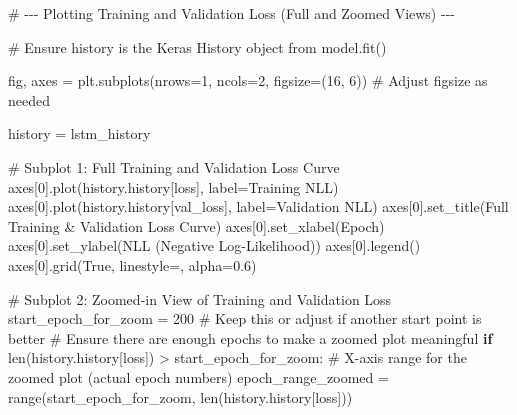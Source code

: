 \documentclass[
  letterpaper,
  DIV=11,
  numbers=noendperiod]{scrreprt}
\newenvironment{Shaded}{\begin{snugshade}}{\end{snugshade}}
\newcommand{\BuiltInTok}[1]{\textcolor[rgb]{0.00,0.23,0.31}{#1}}
\newcommand{\CommentTok}[1]{\textcolor[rgb]{0.37,0.37,0.37}{#1}}
\newcommand{\ControlFlowTok}[1]{\textcolor[rgb]{0.00,0.23,0.31}{\textbf{#1}}}
\newcommand{\DecValTok}[1]{\textcolor[rgb]{0.68,0.00,0.00}{#1}}
\newcommand{\FloatTok}[1]{\textcolor[rgb]{0.68,0.00,0.00}{#1}}
\newcommand{\NormalTok}[1]{\textcolor[rgb]{0.00,0.23,0.31}{#1}}
\newcommand{\OperatorTok}[1]{\textcolor[rgb]{0.37,0.37,0.37}{#1}}
\newcommand{\StringTok}[1]{\textcolor[rgb]{0.13,0.47,0.30}{#1}}
\newcommand{\VariableTok}[1]{\textcolor[rgb]{0.07,0.07,0.07}{#1}}
\begin{document}
\begin{Shaded}
\begin{Highlighting}[]
\CommentTok{\# {-}{-}{-} Plotting Training and Validation Loss (Full and Zoomed Views) {-}{-}{-}}

\CommentTok{\# Ensure \textquotesingle{}history\textquotesingle{} is the Keras History object from model.fit()}

\NormalTok{fig, axes }\OperatorTok{=}\NormalTok{ plt.subplots(nrows}\OperatorTok{=}\DecValTok{1}\NormalTok{, ncols}\OperatorTok{=}\DecValTok{2}\NormalTok{, figsize}\OperatorTok{=}\NormalTok{(}\DecValTok{16}\NormalTok{, }\DecValTok{6}\NormalTok{)) }\CommentTok{\# Adjust figsize as needed}

\NormalTok{history }\OperatorTok{=}\NormalTok{ lstm\_history}

\CommentTok{\# Subplot 1: Full Training and Validation Loss Curve}
\NormalTok{axes[}\DecValTok{0}\NormalTok{].plot(history.history[}\StringTok{\textquotesingle{}loss\textquotesingle{}}\NormalTok{], label}\OperatorTok{=}\StringTok{\textquotesingle{}Training NLL\textquotesingle{}}\NormalTok{)}
\NormalTok{axes[}\DecValTok{0}\NormalTok{].plot(history.history[}\StringTok{\textquotesingle{}val\_loss\textquotesingle{}}\NormalTok{], label}\OperatorTok{=}\StringTok{\textquotesingle{}Validation NLL\textquotesingle{}}\NormalTok{)}
\NormalTok{axes[}\DecValTok{0}\NormalTok{].set\_title(}\StringTok{\textquotesingle{}Full Training \& Validation Loss Curve\textquotesingle{}}\NormalTok{)}
\NormalTok{axes[}\DecValTok{0}\NormalTok{].set\_xlabel(}\StringTok{\textquotesingle{}Epoch\textquotesingle{}}\NormalTok{)}
\NormalTok{axes[}\DecValTok{0}\NormalTok{].set\_ylabel(}\StringTok{\textquotesingle{}NLL (Negative Log{-}Likelihood)\textquotesingle{}}\NormalTok{)}
\NormalTok{axes[}\DecValTok{0}\NormalTok{].legend()}
\NormalTok{axes[}\DecValTok{0}\NormalTok{].grid(}\VariableTok{True}\NormalTok{, linestyle}\OperatorTok{=}\StringTok{\textquotesingle{}{-}{-}\textquotesingle{}}\NormalTok{, alpha}\OperatorTok{=}\FloatTok{0.6}\NormalTok{)}

\CommentTok{\# Subplot 2: Zoomed{-}in View of Training and Validation Loss}
\NormalTok{start\_epoch\_for\_zoom }\OperatorTok{=} \DecValTok{200}  \CommentTok{\# Keep this or adjust if another start point is better}
\CommentTok{\# Ensure there are enough epochs to make a zoomed plot meaningful}
\ControlFlowTok{if} \BuiltInTok{len}\NormalTok{(history.history[}\StringTok{\textquotesingle{}loss\textquotesingle{}}\NormalTok{]) }\OperatorTok{\textgreater{}}\NormalTok{ start\_epoch\_for\_zoom:}
    \CommentTok{\# X{-}axis range for the zoomed plot (actual epoch numbers)}
\NormalTok{    epoch\_range\_zoomed }\OperatorTok{=} \BuiltInTok{range}\NormalTok{(start\_epoch\_for\_zoom, }\BuiltInTok{len}\NormalTok{(history.history[}\StringTok{\textquotesingle{}loss\textquotesingle{}}\NormalTok{]))}


\end{Highlighting}
\end{Shaded}
\end{document}
